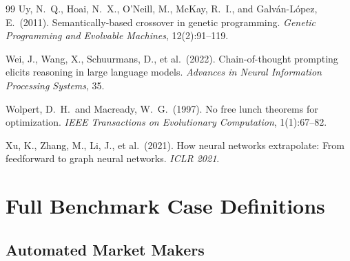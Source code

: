 \documentclass[twoside,11pt]{article}
\begin{document}
\begin{thebibliography}{99}
Uy, N.~Q., Hoai, N.~X., O'Neill, M., McKay, R.~I., and Galv{\'a}n-L{\'o}pez, E.\ (2011).
Semantically-based crossover in genetic programming.
\emph{Genetic Programming and Evolvable Machines}, 12(2):91--119.

Wei, J., Wang, X., Schuurmans, D., et al.\ (2022).
Chain-of-thought prompting elicits reasoning in large language models.
\emph{Advances in Neural Information Processing Systems}, 35.

Wolpert, D.~H.\ and Macready, W.~G.\ (1997).
No free lunch theorems for optimization.
\emph{IEEE Transactions on Evolutionary Computation}, 1(1):67--82.

Xu, K., Zhang, M., Li, J., et al.\ (2021).
How neural networks extrapolate: From feedforward to graph neural networks.
\emph{ICLR 2021}.

\end{thebibliography}

\appendix

\section{Full Benchmark Case Definitions}
\label{app:cases}

\subsection{Automated Market Makers}
\label{sec:bench_amm}
\end{document}
